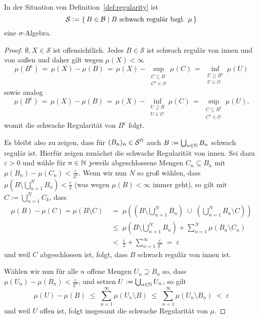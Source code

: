 \documentclass[../main/main.tex]{subfiles}
\begin{document}
	\begin{Hilfssatz}
		In der Situation von Definition~\ref{def:regularity} ist
		$$\mathcal{S} \vcentcolon = \left\{\, B \in \mathcal{B} \; | \; B \text{ schwach regulär bzgl. } \mu \,\right\}$$
		eine $\sigma$-Algebra.
	\end{Hilfssatz}
	
	\begin{proof}
		$\emptyset, X \in \mathcal{S}$ ist offensichtlich. Jedes $B \in \mathcal{S}$ ist schwach regulär 
		von innen und von außen und daher gilt wegen $\mu(X) < \infty$
		$$\mu(B^\mathsf{c}) \, = \, \mu(X) - \mu(B) \, = \, \mu(X) - \sup_{\substack{C \subseteq B \\ C^\mathsf{c} \in \mathcal{O}}} \mu(C) \, = \, \inf_{\substack{U \supseteq B^\mathsf{c} \\ U \in \mathcal{O}}} \mu(U)$$
		sowie analog
		$$\mu(B^\mathsf{c}) \, = \, \mu(X) - \mu(B) \, = \, \mu(X) - \inf_{\substack{U \supseteq B \\ U \in \mathcal{O}}} \mu(C) \, = \, \sup_{\substack{C \subseteq B^\mathsf{c} \\ C^\mathsf{c} \in \mathcal{O}}} \mu(U) \text{,}$$
		womit die schwache Regularität von $B^\mathsf{c}$ folgt. 
		
		Es bleibt also zu zeigen, dass für $(B_n)_n \in \mathcal{S}^{\mathbb{N}}$ auch $B \vcentcolon = \bigcup_{n \in \mathbb{N}} B_n$ 
		schwach regulär ist. Hierfür zeigen zunächst die schwache Regularität von innen. 
		Sei dazu $\varepsilon > 0$ und wähle für $n \in \mathbb{N}$ jeweils abgeschlossene Mengen 
		$C_n \subseteq B_n$ mit $\mu(B_n) - \mu(C_n) < \frac{\varepsilon}{3^n}$.
		Wenn wir nun $N$ so groß wählen, dass $\mu\left( B \setminus \bigcup_{n=1}^N B_n \right) < \frac{\varepsilon}{2}$ 
		(was wegen $\mu(B) < \infty$ immer geht), so gilt mit $C := \bigcup_{n=1}^N C_k$, dass 
		\begin{align*}
			\mu(B) - \mu(C) = \mu(B\setminus C) \; &=    \; \mu\left( \left( B \setminus \bigcup_{n=1}^N B_n \right) \; \cup \; \left( \bigcup_{n=1}^N B_n  \setminus C \right) \right) \\
			                                       &\leq \; \mu \left( B \setminus \bigcup_{n=1}^N B_n \right) + \sum_{n=1}^{N} \mu(B_n \setminus C_n) \\
			                                       &<    \; \frac{\varepsilon}{2} + \sum_{n=1}^{\infty} \frac{\varepsilon}{3^n} \; = \; \varepsilon
		\end{align*}
		und weil $C$ abgeschlossen ist, folgt, dass $B$ schwach regulär von innen ist.
		
		Wählen wir nun für alle $n$ offene Mengen $U_n \supseteq B_n$ so, 
		dass $\mu(U_n) - \mu(B_n) < \frac{\varepsilon}{2^n}$, und setzen $U := \bigcup_{n \in \mathbb{N}} U_n$, so gilt
		$$\mu(U) - \mu(B) \; \leq \; \sum_{n=1}^\infty \mu(U_n \setminus B) \; \leq \; \sum_{n=1}^\infty \mu(U_n \setminus B_n) \; < \; \varepsilon$$
		und weil $U$ offen ist, folgt insgesamt die schwache Regularität von $\mu$.
	\end{proof}
	
\end{document}
